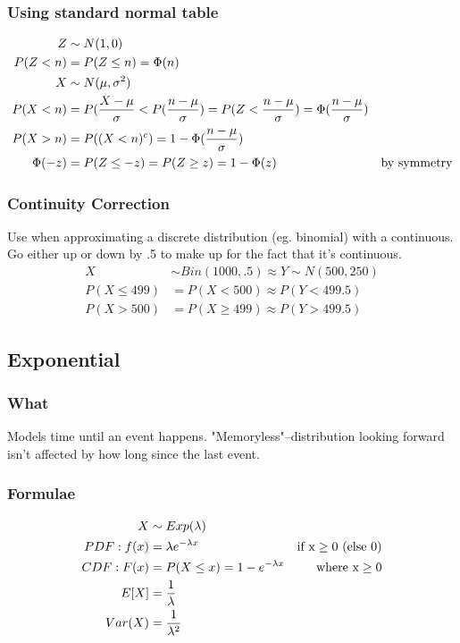 \documentclass[12pt]{amsart}
\begin{document}
\subsubsection{Using standard normal table}
\begin{align*}
Z &\sim N(1,0) \\
P(Z < n)&= P(Z \leq n) = \Phi(n) \\
X &\sim N(\mu, \sigma^2) \\
P(X < n) &= P({X - \mu \over \sigma} < P({n - \mu \over \sigma}) = P(Z < {n - \mu \over \sigma}) = \Phi({n - \mu \over \sigma}) \\
P(X > n) &= P((X < n)^c) = 1 - \Phi({n - \mu \over \sigma}) \\
\Phi(-z) &= P(Z \leq -z) = P(Z \geq z) = 1 - \Phi(z) & \text{by symmetry}
\end{align*}
\subsubsection{Continuity Correction}
Use when approximating a discrete distribution (eg. binomial) with a continuous. Go either up or down by .5 to make up for the fact that it's continuous.
\begin{align*}
X &\sim Bin(1000, .5) \approx Y \sim N(500, 250)\\
P(X \leq 499) &= P(X < 500) \approx P(Y < 499.5) \\
P(X > 500) &= P(X \geq 499) \approx P(Y > 499.5)
\end{align*}
%
\subsection{Exponential}
\subsubsection{What}
Models time until an event happens. "Memoryless"--distribution looking forward isn't affected by how long since the last event.
\subsubsection{Formulae}
\begin{align*}
X &\sim Exp(\lambda) \\
PDF: f(x) &= \lambda e^{-\lambda x} & \text{if x} \geq 0 \text{ (else 0)} \\
CDF: F(x) &= P(X \leq x) = 1 - e^{-\lambda x} & \text{where x} \geq 0 \\
E[X] &= {1 \over \lambda} \\
Var(X) &= {1 \over \lambda^2}
\end{align*}
%
\end{document}
